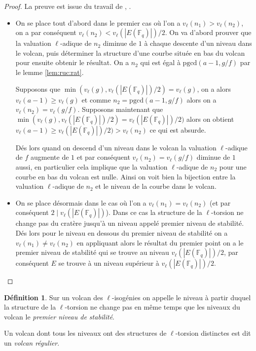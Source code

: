 \documentclass[10pt,a4paper]{book}
\theoremstyle{plain}
\theoremstyle{definition}
\theoremstyle{definition}
\theoremstyle{definition}
\theoremstyle{definition}
\theoremstyle{definition}
\newtheorem{defi}[thm]{Définition}
\theoremstyle{remark}
\theoremstyle{remark}
\theoremstyle{definition}
\begin{document}
\begin{proof}
La preuve est issue du travail de \cite{MiretMSTV08}, \cite{Ionica2010}.
\begin{itemize}
\item On se place tout d'abord dans le premier cas où l'on a $v_{\ell}(n_1)>v_{\ell}(n_2)$, on a par conséquent $v_{\ell}(n_2) < v_{\ell}(|E(\mathbb{F}_q)|)/2$. On va d'abord prouver que la valuation $\ell$-adique de $n_2$ diminue de $1$ à chaque descente d'un niveau dans le volcan, puis déterminer la structure d'une courbe située en bas du volcan pour ensuite obtenir le résultat.  On a $n_2$ qui est égal à $\mathrm{pgcd}(a-1,g/f)$ par le lemme \ref{lem:ruc:rat}.

Supposons que $\min(v_{\ell}(g),v_{\ell}(|E(\mathbb{F}_q)|)/2)= v_{\ell}(g)$, on a alors $v_{\ell}(a-1) \geqslant v_{\ell}(g)$ et comme $n_2=\mathrm{pgcd}(a-1,g/f)$ alors on a $v_{\ell}(n_2)=v_{\ell}(g/f)$. Supposons maintenant que $\min(v_{\ell}(g),v_{\ell}(|E(\mathbb{F}_q)|)/2)= v_{\ell}(|E(\mathbb{F}_q)|)/2)$ alors on obtient $v_{\ell}(a-1) \geqslant v_{\ell}(|E(\mathbb{F}_q)|)/2) > v_{\ell}(n_2)$ ce qui est absurde. 

Dés lors quand on descend d'un niveau dans le volcan la valuation $\ell$-adique de $f$ augmente de $1$ et par conséquent $v_{\ell}(n_2)=v_{\ell}(g/f)$ diminue de $1$ aussi, en particulier cela implique que la valuation $\ell$-adique de $n_2$ pour une courbe en bas du volcan est nulle. Ainsi on voit bien la bijection entre la valuation $\ell$-adique de $n_2$ et le niveau de la courbe dans le volcan.

\item On se place désormais dans le cas où l'on a $v_{\ell}(n_1)=v_{\ell}(n_2)$ (et par conséquent $2 \mid v_{\ell}(|E(\mathbb{F}_q)|)$). Dans ce cas la structure de la $\ell$-torsion ne change pas du cratère jusqu'à un niveau appelé premier niveau de stabilité. Dés lors pour le niveau en dessous du premier niveau de stabilité on a $v_{\ell}(n_1) \neq v_{\ell}(n_2)$ en appliquant alors le résultat du premier point on a le premier niveau de stabilité qui se trouve au niveau $v_{\ell}(|E(\mathbb{F}_q)|)/2$, par conséquent $E$ se trouve à un niveau supérieur à $v_{\ell}(|E(\mathbb{F}_q)|)/2$.
\end{itemize}
\end{proof}

\begin{defi}
Sur un volcan des $\ell$-isogénies on appelle le niveau à partir duquel la structure de la $\ell$-torsion ne change pas en même temps que les niveaux du volcan le \emph{premier niveau de stabilité}.

Un volcan dont tous les niveaux ont des structures de $\ell$-torsion distinctes est dit un \emph{volcan régulier}.
\end{defi}
\end{document}
